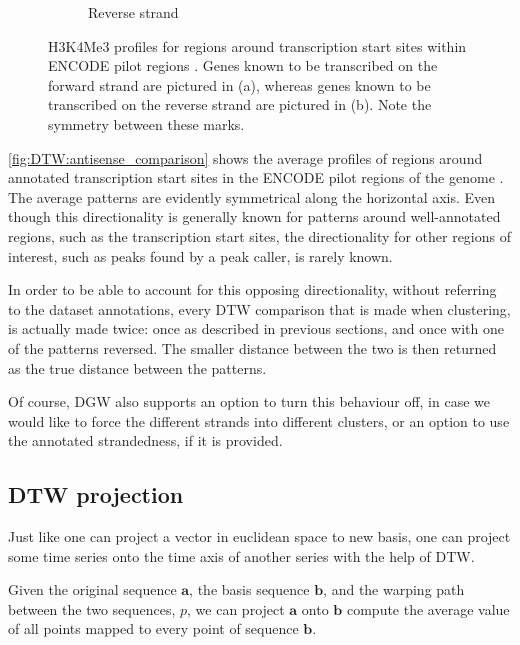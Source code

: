 \documentclass[parskip]{cs4rep}
\newcommand{\histonemodification}[1]{#1}
\begin{document}
\begin{figure}
\begin{subfigure}[b]{0.3\textwidth}
         \caption{Reverse strand}
         \label{fig:DTW:antisense_comparison:reverse}
    \end{subfigure}
    \caption{\histonemodification{H3K4Me3} profiles for regions around transcription start sites within ENCODE pilot regions \cite{ENCODEProjectConsortium:2007fu}. Genes known to be transcribed on the forward strand are pictured in (a), whereas genes known to be transcribed on the reverse strand are pictured in (b). Note the symmetry between these marks.}
    \label{fig:DTW:antisense_comparison}
\end{figure}

\autoref{fig:DTW:antisense_comparison} shows the average profiles of regions around annotated transcription start sites in the ENCODE pilot regions of the genome \cite{ENCODEProjectConsortium:2007fu}. The average patterns are evidently symmetrical along the horizontal axis.
Even though this directionality is generally known for patterns around well-annotated regions, such as the transcription start sites, the directionality for other regions of interest, such as peaks found by a peak caller, is rarely known.  

In order to be able to account for this opposing directionality, without referring to the dataset annotations, every DTW comparison that is made when clustering, is actually made twice: once as described in previous sections, and once with one of the patterns reversed. The smaller distance between the two is then returned as the true distance between the patterns. 

Of course, DGW also supports an option to turn this behaviour off, in case we would like to force the different strands into different clusters, or an option to use the annotated strandedness, if it is provided.

\subsection{DTW projection}
\label{sec:dtw-projection}

Just like one can project a vector in euclidean space to new basis, one can project some time series onto the time axis of another series with the help of DTW. 

Given the original sequence $\mathbf{a}$, the basis sequence $\mathbf{b}$, and the warping path between the two sequences, $p$, we can project $\mathbf{a}$ onto $\mathbf{b}$ compute the average value of all points mapped to every point of sequence $\mathbf{b}$.
\end{document}
